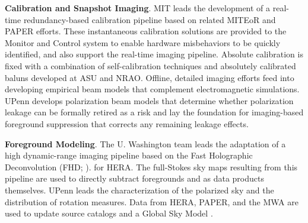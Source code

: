 \documentclass[ars]{/Users/daviddeboer1/Documents/Papers/Copernicus_LaTeX_Package_v_2_7/copernicus}
\begin{document}
{\bf Calibration and Snapshot Imaging}. MIT leads
the development of a real-time redundancy-based calibration pipeline based on related
MITEoR and PAPER efforts.
These instantaneous calibration solutions are provided to
the Monitor and Control system to enable 
hardware misbehaviors to be quickly identified, and also support the
real-time imaging pipeline.  Absolute calibration is fixed with
a combination of self-calibration techniques and absolutely calibrated baluns developed at ASU and NRAO.
Offline, detailed imaging efforts feed into developing
empirical beam models that
complement electromagnetic simulations.  UPenn develops polarization beam models
that determine whether polarization leakage can be formally retired as 
a risk and lay the foundation for imaging-based foreground suppression that
corrects any remaining leakage effects.


{\bf Foreground Modeling}. The U. Washington team leads the adaptation
of a high dynamic-range imaging pipeline
based on the Fast Holographic Deconvolution (FHD; ).
for HERA.  The full-Stokes sky maps resulting from this pipeline
are used to directly subtract foregrounds
and as data products themselves.  UPenn leads
the characterization of the polarized sky and the
distribution of rotation measures.  Data from HERA, PAPER, and the MWA are used
to update source catalogs and a Global
Sky Model . %


\end{document}
